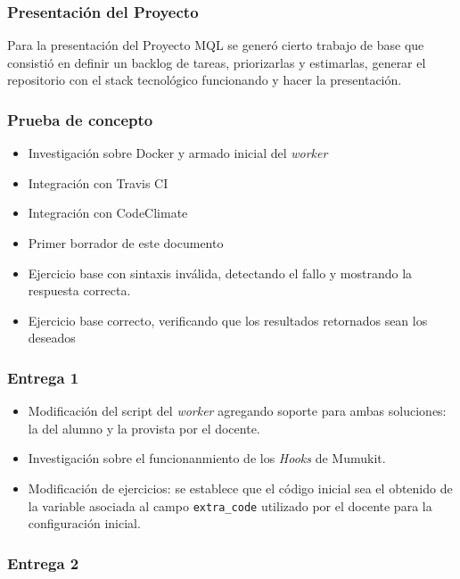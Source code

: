 \subsubsection{Presentación del Proyecto}

Para la presentación del Proyecto MQL se generó cierto
trabajo de base que consistió en definir un backlog de tareas,
priorizarlas y estimarlas, generar el repositorio con
el stack tecnológico funcionando y hacer la presentación.

\subsubsection{Prueba de concepto}

\begin{itemize}
    \item Investigación sobre Docker y armado inicial del \textit{worker}
    \item Integración con Travis CI
    \item Integración con CodeClimate
    \item Primer borrador de este documento
    \item Ejercicio base con sintaxis inválida, detectando el fallo
          y mostrando la respuesta correcta.
    \item Ejercicio base correcto, verificando que los
          resultados retornados sean los deseados
\end{itemize}

\subsubsection{Entrega 1}

\begin{itemize}
    \item Modificación del script del \textit{worker} agregando soporte
    para ambas soluciones: la del alumno y la provista por el docente.
    \item Investigación sobre el funcionanmiento de los \textit{Hooks} de Mumukit.
    \item Modificación de ejercicios: se establece que el código inicial
    sea el obtenido de la variable asociada al campo \texttt{extra\_code}
    utilizado por el docente para la configuración inicial.
\end{itemize}

\subsubsection{Entrega 2}

